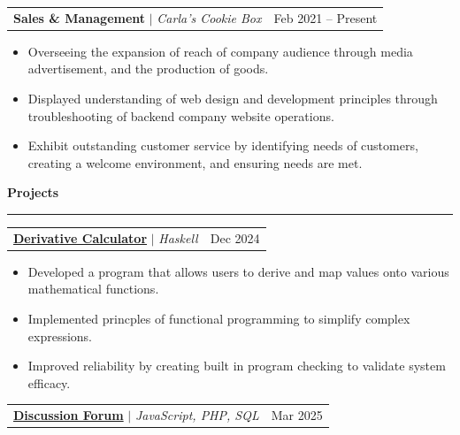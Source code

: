 \documentclass[letterpaper]{article}
\newcommand{\ressection}[1]{
    \vspace{1.0em}
    \noindent\textbf{\large #1}
    \par\vspace{0.3em}
    \hrule
    \vspace{0.6em}
}
\begin{document}
\begin{tabularx}{\textwidth}{X r}
    \textbf{Sales \& Management} $|$ \textit{Carla's Cookie Box} & Feb 2021 -- Present
\end{tabularx}

\vspace{-0.5em}

\begin{itemize}[leftmargin=2.5em, itemsep=-0.2em]
    \item \parbox[t]{\dimexpr\linewidth-2.5em}{Overseeing the expansion of reach of company audience through media advertisement, and the production of goods.}
    \item \parbox[t]{\dimexpr\linewidth-2.5em}{Displayed understanding of web design and development principles through troubleshooting of backend company website operations.}
    \item \parbox[t]{\dimexpr\linewidth-2.5em}{Exhibit outstanding customer service by identifying needs of customers, creating a welcome environment, and ensuring needs are met.}
\end{itemize}

\ressection{Projects}

\begin{tabularx}{\textwidth}{X r}
    \textbf{\href{https://github.com/LucaMawyin/CS1JC3/blob/master/Assignments/1JC3-Assign4/src/Assign_4.hs}{Derivative Calculator}} $|$ \textit{Haskell} & Dec 2024 \\
\end{tabularx}

\vspace{-0.5em}

\begin{itemize}[leftmargin=2.5em, itemsep=-0.2em]
    \item Developed a program that allows users to derive and map values onto various mathematical functions.
    \item Implemented princples of functional programming to simplify complex expressions.
    \item Improved reliability by creating built in program checking to validate system efficacy.
\end{itemize}

\begin{tabularx}{\textwidth}{X r}
    \textbf{\href{https://github.com/LucaMawyin/discussionForum}{Discussion Forum}} $|$ \textit{JavaScript, PHP, SQL} & Mar 2025 \\
\end{tabularx}
\end{document}
